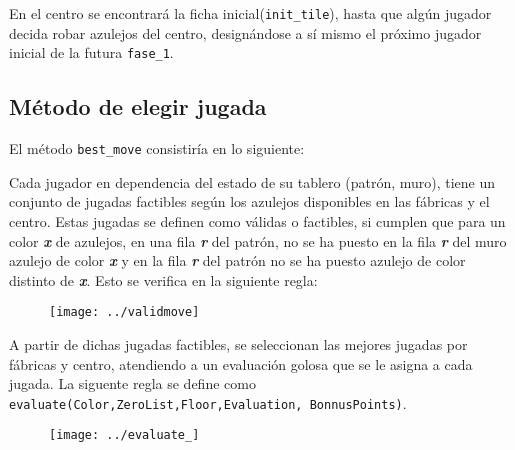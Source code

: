 \documentclass[12pt]{article}
\begin{document}
     En el centro se encontrar\'a la ficha inicial(\texttt{init\_tile}), hasta que alg\'un jugador decida robar azulejos del centro, design\'andose a s\'i mismo el pr\'oximo jugador inicial de la futura \texttt{fase\_1}.
	
	\subsection*{M\'etodo de elegir jugada}
	El m\'etodo \texttt{best\_move} consistir\'ia en lo siguiente:
	
	Cada jugador en dependencia del estado de su tablero (patr\'on, muro), tiene un conjunto de jugadas factibles seg\'un los azulejos disponibles en las f\'abricas y el centro. Estas jugadas se definen como v\'alidas o factibles, si cumplen que para un color \textit{\textbf{x}} de azulejos, en una fila \textit{\textbf{r}} del patr\'on, no se ha puesto en la fila \textit{\textbf{r}} del muro azulejo de color \textit{\textbf{x}} y en la fila \textit{\textbf{r}} del patr\'on no se ha puesto azulejo de color distinto de \textit{\textbf{x}}. Esto se verifica en la siguiente regla:
	\begin{figure}[h]
		\begin{center}
			\texttt{[image: ../validmove]}
		\end{center}
	\end{figure}
    
    A partir de dichas jugadas factibles, se seleccionan las mejores jugadas por f\'abricas y centro, atendiendo a un evaluaci\'on golosa que se le asigna a cada jugada. La siguente regla se define como \texttt{evaluate(Color,ZeroList,Floor,Evaluation,
    	BonnusPoints)}.
    
	\begin{figure}[h]
		\begin{center}
			\texttt{[image: ../evaluate\_]}
		\end{center}
	\end{figure}
    
\end{document}
